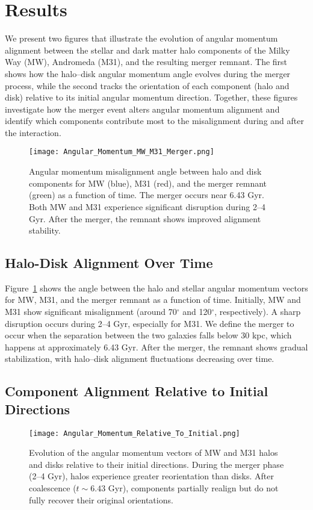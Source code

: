 \documentclass[twocolumn]{aastex631}
\begin{document}
\section{Results}

We present two figures that illustrate the evolution of angular momentum alignment between the stellar and dark matter halo components of the Milky Way (MW), Andromeda (M31), and the resulting merger remnant. The first shows how the halo–disk angular momentum angle evolves during the merger process, while the second tracks the orientation of each component (halo and disk) relative to its initial angular momentum direction. Together, these figures investigate how the merger event alters angular momentum alignment and identify which components contribute most to the misalignment during and after the interaction.

\begin{figure}[h!]
    \centering
    \texttt{[image: Angular\_Momentum\_MW\_M31\_Merger.png]}
    \caption{Angular momentum misalignment angle between halo and disk components for MW (blue), M31 (red), and the merger remnant (green) as a function of time. The merger occurs near 6.43 Gyr. Both MW and M31 experience significant disruption during 2--4 Gyr. After the merger, the remnant shows improved alignment stability.}
    \label{fig:halo_disk_alignment}
\end{figure}

\subsection{Halo-Disk Alignment Over Time}

Figure~\ref{fig:halo_disk_alignment} shows the angle between the halo and stellar angular momentum vectors for MW, M31, and the merger remnant as a function of time. Initially, MW and M31 show significant misalignment (around 70$^\circ$ and 120$^\circ$, respectively). A sharp disruption occurs during 2--4 Gyr, especially for M31. We define the merger to occur when the separation between the two galaxies falls below 30 kpc, which happens at approximately 6.43 Gyr. After the merger, the remnant shows gradual stabilization, with halo–disk alignment fluctuations decreasing over time.




\subsection{Component Alignment Relative to Initial Directions}
\begin{figure}[h!]
    \centering
    \texttt{[image: Angular\_Momentum\_Relative\_To\_Initial.png]}
    \caption{Evolution of the angular momentum vectors of MW and M31 halos and disks relative to their initial directions. During the merger phase (2--4 Gyr), halos experience greater reorientation than disks. After coalescence ($t \sim 6.43$ Gyr), components partially realign but do not fully recover their original orientations.}
    \label{fig:relative_alignment}
\end{figure}
\end{document}
